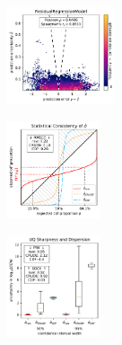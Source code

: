 \begin{figure}[H]
    \begin{subfigure}
    \centering
    \includegraphics[width=0.349\textwidth,valign=t]{uncertainty/figures/uq.residualregressionmodel-correlation.pdf}
    \end{subfigure}
    \begin{subfigure}
    \centering
    \includegraphics[width=0.300\textwidth,valign=t]{uncertainty/figures/uq.residualregressionmodel-consistency.pdf}
    \end{subfigure}
    \begin{subfigure}
    \centering
    \includegraphics[width=0.301\textwidth,valign=t]{uncertainty/figures/uq.residualregressionmodel-sharpness.pdf}
    \end{subfigure}
   

\end{figure}
